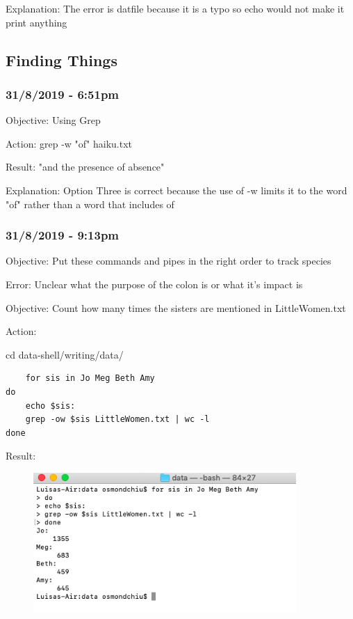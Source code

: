 \documentclass{article}
\begin{document}
Explanation: The error is datfile because it is a typo so echo would not make it print anything

\subsection{Finding Things}
\subsubsection*{31/8/2019 - 6:51pm}

Objective: Using Grep

Action: grep -w "of" haiku.txt

Result: "and the presence of absence"

Explanation: Option Three is correct because the use of -w limits it to the word "of" rather than a word that includes of

\subsubsection*{31/8/2019 - 9:13pm}\label{sec: Colon}

Objective: Put these commands and pipes in the right order to track species 

Error: Unclear what the purpose of the colon is or what it's impact is

Objective: Count how many times the sisters are mentioned in LittleWomen.txt 

Action: 

cd data-shell/writing/data/

\begin{verbatim}
    for sis in Jo Meg Beth Amy
do
	echo $sis:
	grep -ow $sis LittleWomen.txt | wc -l
done
\end{verbatim}

Result:

\begin{figure}[htp]
    \centering
    \includegraphics[width=10cm]{Screenshot24.png}
    \label{fig:ls-24}
\end{figure}
\end{document}
